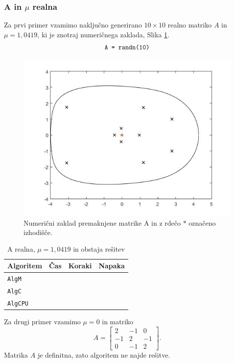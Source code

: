 \documentclass[12pt,a4paper]{amsart}
\theoremstyle{definition}
\theoremstyle{plain}
\begin{document}
\subsubsection{A in $\mu$ realna}

Za prvi primer vzamimo naključno generirano $10\times 10$ realno matriko $A$ in $\mu = 1,0419$, ki je znotraj numeričnega zaklada, Slika \ref{fig:p1}.
$$\verb+A = randn(10)+$$

\begin{figure}[!h]
\centering
\includegraphics[scale=0.4]{RR1.jpg}
\caption{Numerični zaklad premaknjene matrike A in z rdečo $\ast$ označeno izhodišče.}
\label{fig:p1}
\end{figure}

\begin{table}[H]
\begin{tabular}{|l|l|c|r|}
\hline
Algoritem & Čas & Koraki & Napaka\\
\hline
\hline
\verb+AlgM+ & & & \\
\hline
\verb+AlgC+ & & & \\
\hline
\verb+AlgCPU+ & & & \\
\hline
\end{tabular}
\caption{A realna, $\mu = 1,0419$ in obstaja rešitev}
\label{t1}
\end{table}
Za drugi primer vzamimo $\mu =0$ in matriko
\begin{equation*}
A=\begin{bmatrix}
2 &-1&0\\
-1&2&-1\\
0&-1&2
\end{bmatrix}.
\end{equation*}
Matrika $A$ je definitna, zato algoritem ne najde rešitve.
\end{document}
